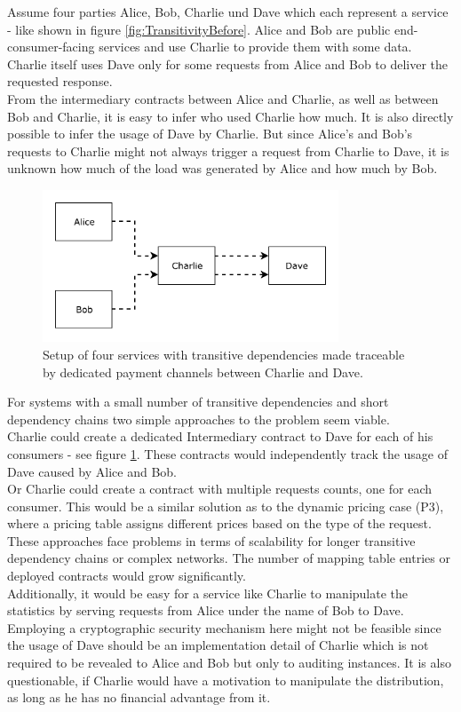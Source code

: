 \documentclass[a4paper,12pt]{scrartcl}
\begin{document}
Assume four parties Alice, Bob, Charlie und Dave which each represent a service - like shown in figure \ref{fig:TransitivityBefore}. Alice and Bob are public end-consumer-facing services and use Charlie to provide them with some data. Charlie itself uses Dave only for some requests from Alice and Bob to deliver the requested response.\\
From the intermediary contracts between Alice and Charlie, as well as between Bob and Charlie, it is easy to infer who used Charlie how much. It is also directly possible to infer the usage of Dave by Charlie. But since Alice's and Bob's requests to Charlie might not always trigger a request from Charlie to Dave, it is unknown how much of the load was generated by Alice and how much by Bob.\\

\begin{figure}[H]
\centering
\includegraphics[width=250pt]{Images/TransitivityAfter.pdf}
\caption{Setup of four services with transitive dependencies made traceable by dedicated payment channels between Charlie and Dave.}
\label{fig:TransitivityAfter}
\end{figure}

For systems with a small number of transitive dependencies and short dependency chains two simple approaches to the problem seem viable.\\
Charlie could create a dedicated Intermediary contract to Dave for each of his consumers - see figure \ref{fig:TransitivityAfter}. These contracts would independently track the usage of Dave caused by Alice and Bob.\\
Or Charlie could create a contract with multiple requests counts, one for each consumer. This would be a similar solution as to the dynamic pricing case (P3), where a pricing table assigns different prices based on the type of the request.\\

These approaches face problems in terms of scalability for longer transitive dependency chains or complex networks. The number of mapping table entries or deployed contracts would grow significantly.\\
Additionally, it would be easy for a service like Charlie to manipulate the statistics by serving requests from Alice under the name of Bob to Dave. Employing a cryptographic security mechanism here might not be feasible since the usage of Dave should be an implementation detail of Charlie which is not required to be revealed to Alice and Bob but only to auditing instances. It is also questionable, if Charlie would have a motivation to manipulate the distribution, as long as he has no financial advantage from it.
\end{document}
